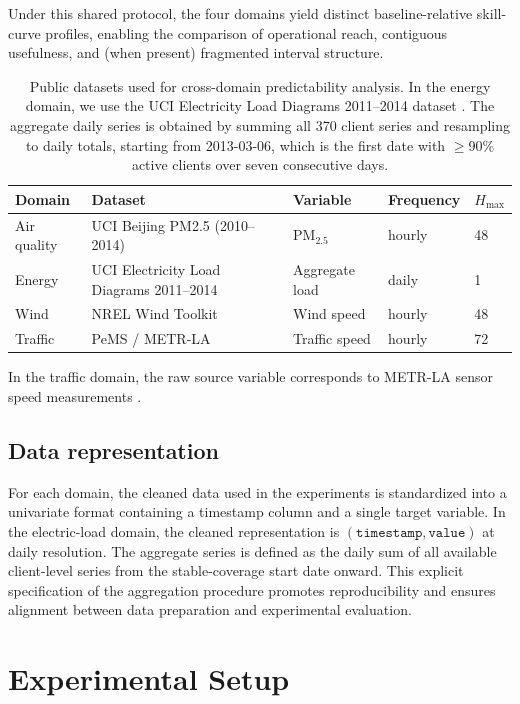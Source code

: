 \documentclass[pdflatex]{sn-jnl}
\begin{document}
Under this shared protocol, the four domains yield distinct baseline-relative skill-curve profiles, enabling the comparison of operational reach, contiguous usefulness, and (when present) fragmented interval structure.

\begin{table}[h]
\centering
\small
\setlength{\tabcolsep}{3pt}
\begin{tabular}{lllll}
\toprule
Domain & Dataset & Variable & Frequency & $H_{\max}$ \\
\midrule
Air quality & UCI Beijing PM2.5 (2010--2014) & PM$_{2.5}$ & hourly & 48 \\
Energy & UCI Electricity Load Diagrams 2011--2014 & Aggregate load & daily & 1 \\
Wind & NREL Wind Toolkit & Wind speed & hourly & 48 \\
Traffic & PeMS / METR-LA & Traffic speed & hourly & 72 \\
\bottomrule
\end{tabular}
\caption{Public datasets used for cross-domain predictability analysis.
In the energy domain, we use the UCI Electricity Load Diagrams
2011--2014 dataset \citep{trindade2015}.
The aggregate daily series is obtained by summing all 370 client series
and resampling to daily totals, starting from 2013-03-06, which is the
first date with $\geq$90\% active clients over seven consecutive days.}
\label{tab:datasets}
\end{table}

In the traffic domain, the raw source variable corresponds to METR-LA
sensor speed measurements \citep{li2018dcrnn}.

\subsection{Data representation}

For each domain, the cleaned data used in the experiments is
standardized into a univariate format containing a timestamp column and
a single target variable. In the electric-load domain, the cleaned
representation is $(\texttt{timestamp}, \texttt{value})$ at daily
resolution. The aggregate series is defined as the daily sum of all
available client-level series from the stable-coverage start date
onward. This explicit specification of the aggregation procedure
promotes reproducibility and ensures alignment between data preparation
and experimental evaluation.

\section{Experimental Setup}
\end{document}
